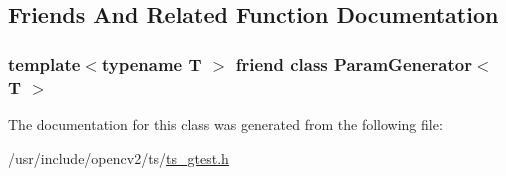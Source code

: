 \subsection{Friends And Related Function Documentation}
\hypertarget{classtesting_1_1internal_1_1ParamIterator_ab73a355ae191f2f7eab54b65ca557714}{
\subsubsection[{Param\-Generator$<$ T $>$}]{\setlength{\rightskip}{0pt plus 5cm}template$<$typename T $>$ friend class {\bf Param\-Generator}$<$ {\bf T} $>$\hspace{0.3cm}{\ttfamily [friend]}}}\label{classtesting_1_1internal_1_1ParamIterator_ab73a355ae191f2f7eab54b65ca557714}


The documentation for this class was generated from the following file\-:\begin{DoxyCompactItemize}
\item 
/usr/include/opencv2/ts/\hyperlink{ts__gtest_8h}{ts\-\_\-gtest.\-h}\end{DoxyCompactItemize}
